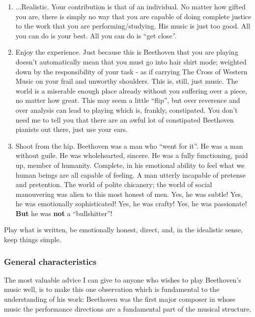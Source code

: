 \documentclass{article}
\begin{document}
\begin{enumerate}
    \item ...Realistic.
        Your contribution is that of an individual.
        No matter how gifted you are, there is simply no way that you are capable of doing complete justice to the work that you are performing/studying.
        His music is just too good.
        All you can do is your best.
        All you can do is ``get close''.
    \item Enjoy the experience.
        Just because this is Beethoven that you are playing doesn't automatically mean that you must go into hair shirt mode; weighted down by the responsibility of your task - as if carrying The Cross of Western Music on your frail and unworthy shoulders.
        This is, still, just music.
        The world is a miserable enough place already without you suffering over a piece, no matter how great.
        This may seem a little ``flip'', but over reverence and over analysis can lead to playing which is, frankly, constipated.
        You don't need me to tell you that there are an awful lot of constipated Beethoven pianists out there, just use your ears.
    \item Shoot from the hip.
        Beethoven was a man who ``went for it''.
        He was a man without guile.
        He was wholehearted, sincere.
        He was a fully functioning, paid up, member of humanity.
        Complete, in his emotional ability to feel what we human beings are all capable of feeling.
        A man utterly incapable of pretense and pretention.
        The world of polite chicanery; the world of social manouvering was alien to this most honest of men.
        Yes, he was subtle!
        Yes, he was emotionally  sophisticated!
        Yes, he was crafty!
        Yes, he was passionate!
        \textbf{But} he was \textbf{not} a ``bullshitter''!
\end{enumerate}

Play what is written, be emotionally honest, direct, and, in the idealistic sense, keep things simple.

\subsubsection{General characteristics}

The most valuable advice I can give to anyone who wishes to play Beethoven's music well, is to make this one observation which is fundamental to the understanding of his work: Beethoven was the first major composer in whose music the performance directions are a fundamental part of the musical structure.
\end{document}

